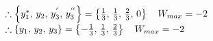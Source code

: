 \documentclass[12pt]{article}
\begin{document}
  \(\therefore \left\{y_1^{*},\,y_2,\,y_3^{'},\,y_3^{''}\right\}=\left\{\frac{1}{3},\,\frac{1}{3},\,\frac{2}{3},\,0\right\}\quad W_{max}=-2\)\\
  \(\therefore \left\{y_1,\,y_2,\,y_3\right\}=\left\{-\frac{1}{3},\,\frac{1}{3},\,\frac{2}{3}\right\}\quad W_{max}=-2\)
\end{document}
